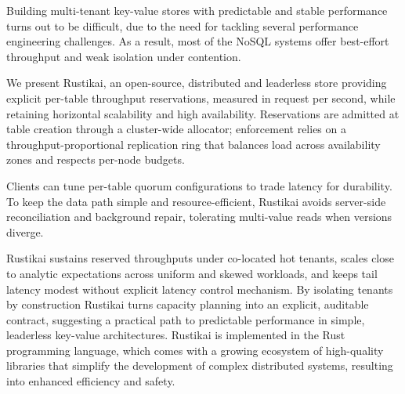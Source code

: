Building multi-tenant key-value stores with predictable and stable performance
turns out to be difficult, due to the need for tackling several performance engineering challenges.
As a result, most of the NoSQL systems offer best-effort throughput and weak isolation under contention.

We present Rustikai, an open-source, distributed and leaderless store providing explicit
per-table throughput reservations, measured in request per second,
while retaining horizontal scalability and high availability.
Reservations are admitted at table creation through a cluster-wide allocator;
enforcement relies on a throughput-proportional replication ring that balances
load across availability zones and respects per-node budgets.

Clients can tune per-table quorum configurations to trade latency for durability.
To keep the data path simple and resource-efficient, Rustikai avoids
server-side reconciliation and background repair, tolerating multi-value reads
when versions diverge.

Rustikai sustains reserved throughputs under co-located hot tenants, scales close to
analytic expectations across uniform and skewed workloads, and keeps tail
latency modest without explicit latency control mechanism.
By isolating tenants by construction Rustikai turns capacity planning into an
explicit, auditable contract, suggesting a practical path to predictable
performance in simple, leaderless key-value architectures.
Rustikai is implemented in the Rust programming language, which comes with
a growing ecosystem of high-quality libraries that simplify the development of complex distributed systems,
resulting into enhanced efficiency and safety.
